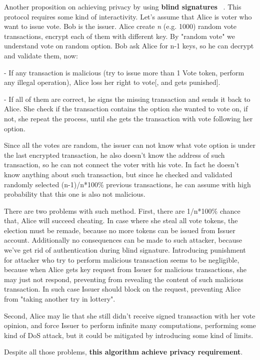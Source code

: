 \documentclass[runningheads]{llncs}
\begin{document}
Another proposition on achieving privacy by using \textbf{blind signatures} ~\cite{applied_cryptography}. This protocol requires some kind of interactivity. 
Let's assume that Alice is voter who want to issue vote. Bob is the issuer.
Alice create \textit{n} (e.g. 1000) random vote transactions, encrypt each of them with different key. By "random vote" we understand vote on random option. Bob ask Alice for n-1 keys, so he can decrypt and validate them, now: 

- If any transaction is malicious (try to issue more than 1 Vote token, perform any illegal operation), Alice loss her right to vote[, and gets punished].

- If all of them are correct, he signs the missing transaction and sends it back to Alice. She check if the transaction contains the option she wanted to vote on, if not, she repeat the process, until she gets the transaction with vote following her option.

Since all the votes are random, the issuer can not know what vote option is under the last encrypted transaction, he also doesn't know the address of such transaction, so he can not connect the voter with his vote. In fact he doesn't know anything about such transaction, but since he checked and validated randomly selected (n-1)/n*100\% previous transactions, he can assume with high probability that this one is also not malicious.

There are two problems with such method.
First, there are 1/n*100\% chance that, Alice will succeed cheating. In case where she steal all vote tokens, the election must be remade, because no more tokens can be issued from Issuer account. Additionally no consequences can be made to such attacker, because we've get rid of authentication during blind signature. Introducing punishment for attacker who try to perform malicious transaction seems to be negligible, because when Alice gets key request from Issuer for malicious transactions, she may just not respond, preventing from revealing the content of such malicious transaction. In such case Issuer should block on the request, preventing Alice from "taking another try in lottery".

Second, Alice may lie that she still didn't receive signed transaction with her vote opinion, and force Issuer to perform infinite many computations, performing some kind of DoS attack, but it could be mitigated by introducing some kind of limits.

Despite all those problems, \textbf{this algorithm achieve privacy requirement}.
\end{document}
